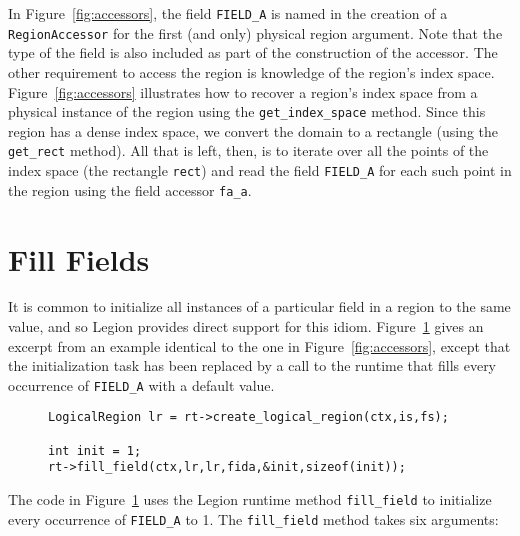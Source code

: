 In Figure~\ref{fig:accessors}, the field
{\tt FIELD\_A} is named in the creation of a {\tt RegionAccessor} for the first (and only) physical region argument.
Note that the type of the field is also included as part of the construction of the accessor.
The other requirement to access the region is knowledge of the region's index space.  Figure~\ref{fig:accessors}
illustrates how to recover a region's index space from a physical instance of the region using the {\tt get\_index\_space} method.
Since this region has a dense index space, we convert the domain to a rectangle (using the {\tt get\_rect} method).
All that is left, then, is to iterate over all the points of the index space (the rectangle {\tt rect}) and read the
field {\tt FIELD\_A} for each such point in the region using the field accessor {\tt fa\_a}.

\section{Fill Fields}
\label{sec:fill}

It is common to initialize all instances of a particular field in a region to the same value, and so Legion
provides direct support for this idiom.  Figure~\ref{fig:fill} gives an excerpt from an example identical
to the one in Figure~\ref{fig:accessors}, except that the initialization task has been replaced by a call to
the runtime that fills every occurrence of {\tt FIELD\_A} with a default value.

\begin{figure}
{\small
\begin{lstlisting}
LogicalRegion lr = rt->create_logical_region(ctx,is,fs);

int init = 1;
rt->fill_field(ctx,lr,lr,fida,&init,sizeof(init));
\end{lstlisting}
}
\caption{}
\label{fig:fill}
\end{figure}
The code in Figure~\ref{fig:fill} uses the Legion runtime method {\tt fill\_field} to initialize every 
occurrence of {\tt FIELD\_A} to 1.  The {\tt fill\_field} method takes six arguments:

